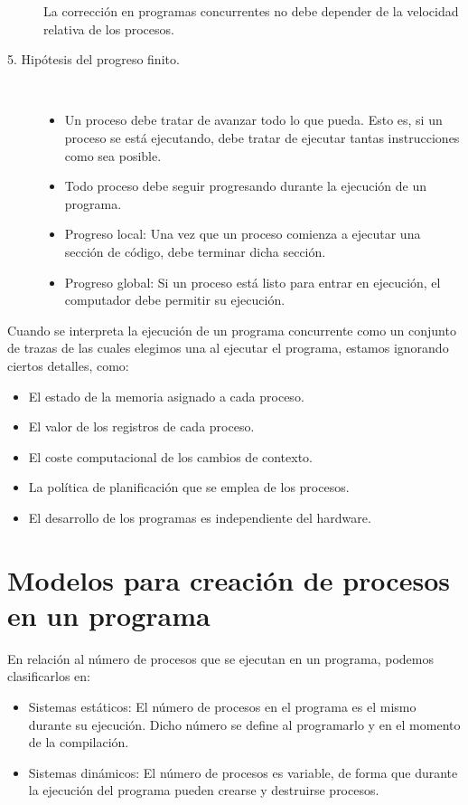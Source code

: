 \begin{description}
        La corrección en programas concurrentes no debe depender de la velocidad relativa de los procesos.
    \item [5. Hipótesis del progreso finito.]~\\
        \begin{itemize}
            \item Un proceso debe tratar de avanzar todo lo que pueda. Esto es, si un proceso se está ejecutando, debe tratar de ejecutar tantas instrucciones como sea posible.
            \item Todo proceso debe seguir progresando durante la ejecución de un programa.
            \item Progreso local: Una vez que un proceso comienza a ejecutar una sección de código, debe terminar dicha sección.
            \item Progreso global: Si un proceso está listo para entrar en ejecución, el computador debe permitir su ejecución.
        \end{itemize}
\end{description}

\noindent
Cuando se interpreta la ejecución de un programa concurrente como un conjunto de trazas de las cuales elegimos una al ejecutar el programa, estamos ignorando ciertos detalles, como:
\begin{itemize}
    \item El estado de la memoria asignado a cada proceso.
    \item El valor de los registros de cada proceso.
    \item El coste computacional de los cambios de contexto.
    \item La política de planificación que se emplea de los procesos.
    \item El desarrollo de los programas es independiente del hardware.
\end{itemize}

\section{Modelos para creación de procesos en un programa}
En relación al número de procesos que se ejecutan en un programa, podemos clasificarlos en:
\begin{itemize}
    \item Sistemas estáticos: El número de procesos en el programa es el mismo durante su ejecución. Dicho número se define al programarlo y en el momento de la compilación.
    \item Sistemas dinámicos: El número de procesos es variable, de forma que durante la ejecución del programa pueden crearse y destruirse procesos.
\end{itemize}


